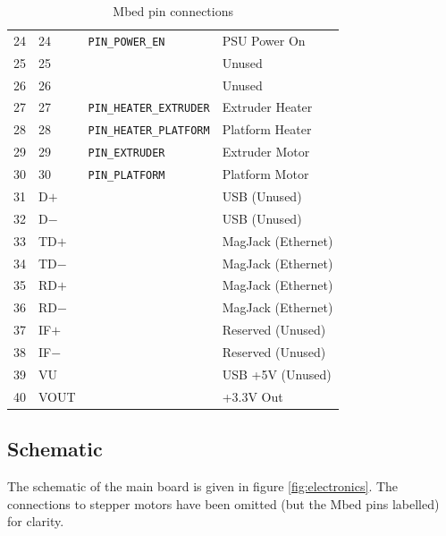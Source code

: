 \begin{table}
\begin{tabular}{l l l l}
					24 & 24  & \verb|PIN_POWER_EN| & PSU Power On \\
					25 & 25  & & Unused \\
					26 & 26  & & Unused \\
					27 & 27  & \verb|PIN_HEATER_EXTRUDER| & Extruder Heater \\
					28 & 28  & \verb|PIN_HEATER_PLATFORM| & Platform Heater \\
					29 & 29  & \verb|PIN_EXTRUDER| & Extruder Motor \\
					30 & 30  & \verb|PIN_PLATFORM| & Platform Motor \\
					31 & D$+$  & & USB (Unused) \\
					32 & D$-$  & & USB (Unused) \\
					33 & TD$+$ & & MagJack (Ethernet) \\
					34 & TD$-$ & & MagJack (Ethernet) \\
					35 & RD$+$ & & MagJack (Ethernet) \\
					36 & RD$-$ & & MagJack (Ethernet) \\
					37 & IF$+$ & & Reserved (Unused) \\
					38 & IF$-$ & & Reserved (Unused) \\
					39 & VU    & & USB +5V (Unused) \\
					40 & VOUT  & & +3.3V Out \\
					\bottomrule
				\end{tabular}
				
				\caption{Mbed pin connections}
				\label{tab:mbed}
			\end{table}
		
		
		\subsection{Schematic}
			
			The schematic of the main board is given in figure \ref{fig:electronics}.
			The connections to stepper motors have been omitted (but the Mbed pins
			labelled) for clarity.
			
